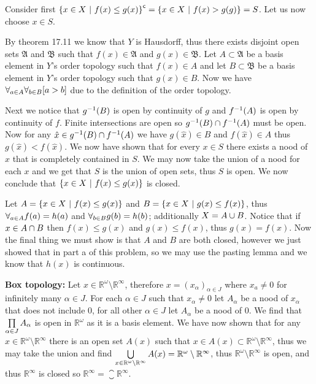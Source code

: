 \documentclass{article}
\begin{document}
\bigskip
{} Consider first ${\left\{ {{x\in X} \ |\  {f(x)\le g(x)}} \right\}}^{\mathsf{c}} = \left\{ {{x\in X} \ |\  {f(x)>g(g)}} \right\} = S$. Let us now choose $x\in S$.

By theorem 17.11 we know that $Y$ is Hausdorff, thus there exists disjoint open sets $\mathfrak A$ and $\mathfrak B$ such that $f(x)\in\mathfrak A$ and $g(x)\in\mathfrak B$. Let $A \subset\mathfrak A$ be a basis element in $Y$'s order topology such that $f(x)\in A$ and let $B\subset\mathfrak B$ be a basis element in $Y$'s order topology such that $g(x)\in B$. Now we have $\forall_{a\in A} {\forall_{b\in B} {[a>b]} } $ due to the definition of the order topology.

Next we notice that ${g}^{-1}(B)$ is open by continuity of $g$ and ${f}^{-1}(A)$ is open by continuity of $f$. Finite intersections are open so ${g}^{-1}(B) \cap {f}^{-1}(A)$ must be open. Now for any $\hat x\in {g}^{-1}(B) \cap {f}^{-1}(A)$ we have $g(\hat x) \in B$ and $f(\hat x) \in A$ thus $g(\hat x) < f(\hat x)$. We now have shown that for every $x \in S$ there exists a nood of $x$ that is completely contained in $S$. We may now take the union of a nood for each $x$ and we get that $S$ is the union of open sets, thus $S$ is open. We now conclude that $\left\{ {{x\in X} \ |\  {f(x)\le g(x)}} \right\}$ is closed.

\medskip
{}
Let $A = \left\{ {{x\in X} \ |\  {f(x) \le g(x)}} \right\}$ and $B = \left\{ {{x\in X} \ |\  {g(x) \le f(x)}} \right\}$, thus $\forall_{a \in A} {f(a) = h(a)} $ and $\forall_{b \in B} {g(b) = h(b)} $; additionally $X = A \cup B$. Notice that if $x\in A\cap B$ then $f(x) \le g(x)$ and $g(x) \le f(x)$, thus $g(x) = f(x)$. Now the final thing we must show is that $A$ and $B$ are both closed, however we just showed that in part a of this problem, so we may use the pasting lemma and we know that $h(x)$ is continuous.

\bigskip
{}
\textbf{Box topology:} Let $x\in \mathbb R^\omega\setminus\mathbb R^\infty$, therefore $x = (x_\alpha)_{\alpha\in J}$ where $x_a\not=0$ for infinitely many $\alpha\in J$. For each $\alpha\in J$ such that $x_\alpha\not=0$ let $A_\alpha$ be a nood of $x_\alpha$ that does not include $0$, for all other $\alpha\in J$ let $A_\alpha$ be a nood of $0$. We find that $\prod\limits_{\alpha\in J}^{} {A_\alpha} $ is open in $\mathbb R^\omega$ as it is a basis element. We have now shown that for any $x \in\mathbb R^\omega\setminus\mathbb R^\infty$ there is an open set $A(x)$ such that $x \in A(x) \subset\mathbb R^\omega\setminus\mathbb R^\infty$, thus we may take the union and find $\bigcup\limits_{x\in\mathbb R^\omega\setminus\mathbb R^\infty}^{}  {A(x)}  =\mathbb R^\omega\setminus\mathbb R^\infty$, thus $\mathbb R^\omega\setminus\mathbb R^\infty$ is open, and thus $\mathbb R^\infty$ is closed so $\mathbb R^\infty = \closure{\mathbb R^\infty}$.
\end{document}
